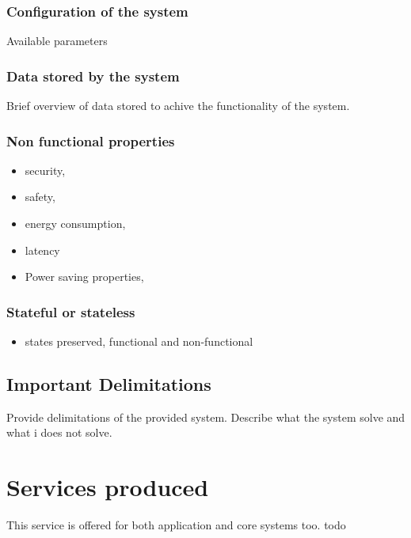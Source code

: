 \documentclass[a4paper]{arrowhead}
\begin{document}
\subsubsection {Configuration of the system}
Available parameters

\subsubsection {Data stored by the system}

Brief overview of data stored to achive the functionality of the system. 

\subsubsection {Non functional properties}

\begin{itemize}
  \item security, 
  \item safety, 
  \item energy consumption,
  \item latency
  \item Power saving properties, 
\end{itemize}

\subsubsection {Stateful or stateless}
\begin{itemize} 
\item states preserved, functional and non-functional
\end{itemize}  
\color{black}  


\subsection{Important Delimitations}
\label{sec:delimitations}

\color{red}
Provide delimitations of the provided system. Describe what the system
solve and what i does not solve.
\color{black}  



\newpage

\section{Services produced}
\label{sec:services}

This service is offered for both application and core systems too. \color{red}todo\color{black}
\end{document}
